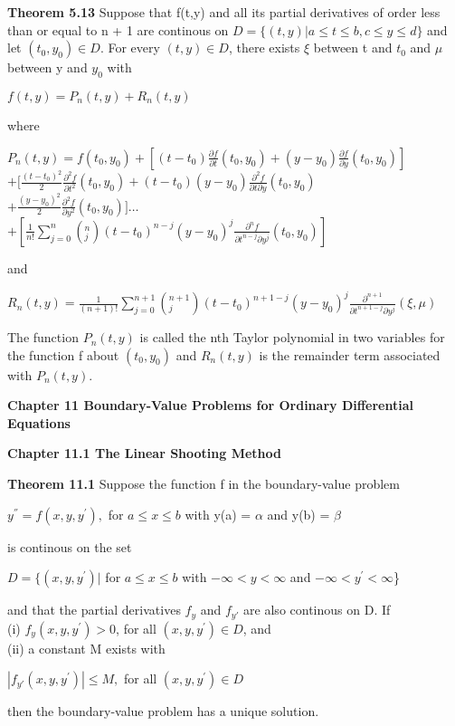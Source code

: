 \documentclass{article}
\begin{document}
\textbf {Theorem 5.13} Suppose that f(t,y) and all its partial derivatives of order less than or equal to n + 1 are continous on $D = \{(t,y) | a \leq t \leq b, c \leq y \leq d \}$ and let $(t_0, y_0) \in D$. For every $(t,y) \in D$, there exists $\xi$ between t and $t_0$ and $\mu$ between y and $y_0$ with
\begin{center}
$f(t,y) = P_n (t,y) + R_n(t,y)$
\end{center}
where
\begin{center}
$P_n(t,y) = f(t_0, y_0) + [ (t-t_0) \frac{\partial f}{\partial t} (t_0, y_0) + (y-y_0) \frac{\partial f}{\partial y} (t_0, y_0)]$ \\
$+ [\frac{(t-t_0)^2}{2} \frac{\partial^2 f}{\partial t^2} (t_0, y_0) + (t-t_0)(y-y_0) \frac{\partial^2 f}{\partial t \partial y} (t_0, y_0)$ \\
$+ \frac {(y-y_0)^2}{2} \frac{\partial^2 f}{\partial y^2} (t_0, y_0)] \dots$ \\
$+ [ \frac{1}{n!} \sum_{j=0}^n (^{n}_{j})(t-t_0)^{n-j} (y-y_0)^j \frac{\partial^n f}{\partial t^{n-j} \partial y^j}(t_0, y_0)]$
\end{center}
and
\begin{center}
$R_n(t,y) = \frac{1}{(n+1)!} \sum_{j=0}^{n+1} (^{n+1}_{j})(t-t_0)^{n+1-j}(y-y_0)^j \frac{\partial^{n+1}}{\partial t^{n+1-j} \partial y^j}(\xi, \mu)$
\end{center}
The function $P_n(t,y)$ is called the nth Taylor polynomial in two variables for the function f about $(t_0, y_0)$ and $R_n(t,y)$ is the remainder term associated with $P_n(t,y)$.

\textbf {Chapter 11 Boundary-Value Problems for Ordinary Differential Equations}

\textbf {Chapter 11.1 The Linear Shooting Method}

\textbf {Theorem 11.1} Suppose the function f in the boundary-value problem
\begin{center}
$y^{''} = f(x,y, y^{'}),$ for $a \leq x \leq b$ with y(a) = $\alpha$ and y(b) = $\beta$
\end{center}
is continous on the set
\begin{center}
$D = \{ (x, y, y^{'}) |$ for $ a \leq x \leq b$ with $- \infty < y < \infty$ and $- \infty < y^{'} < \infty$\}
\end{center}
and that the partial derivatives $f_y$ and $f_{y'}$ are also continous on D. If
\\
(i) $f_y (x, y, y^{'}) > 0$, for all $(x, y, y^{'}) \in D$, and \\
(ii) a constant M exists with
\begin{center}
$| f_{y'} (x, y, y^{'})| \leq M,$ for all $(x, y, y^{'}) \in D$
\end{center}
then the boundary-value problem has a unique solution.
\end{document}
